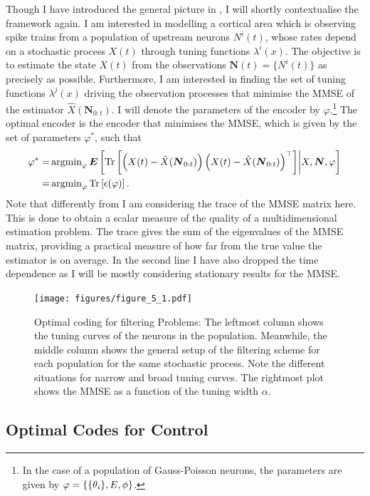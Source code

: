 Though I have introduced the general picture in , I will shortly contextualise the framework again. I am interested in modelling a cortical area which is observing spike
trains from a population of upstream neurons $N^i(t)$, whose rates depend on a stochastic process $X(t)$ through tuning functions $\lambda^i(x)$. The objective is to estimate the 
state $X(t)$ from the observations
$\boldsymbol{N}(t) = \{N^i(t)\}$ as precisely as possible. Furthermore, I am interested in finding the set of tuning functions $\lambda^j(x)$ driving the observation processes that minimise 
the MMSE of the estimator $\hat{X}(\boldsymbol{N}_{0:t})$. I will denote the parameters of the encoder by $\varphi$.\footnote{In the case of a population of Gauss-Poisson neurons, 
the parameters are given by $\varphi = \{\{\theta_i\}, E, \phi\}$.} The optimal encoder is the encoder that minimises the MMSE, which is given by the set of parameters $\varphi^*$,
such that
\begin{align*}
\varphi^* =& \operatorname{argmin}_\varphi \boldsymbol{E}\left[\operatorname{Tr}\left[\left(X(t) - \hat{X}(\boldsymbol{N}_{0:t})\right)\left(X(t) - \hat{X}(\boldsymbol{N}_{0:t})\right)^\top \right]\middle| X, \boldsymbol{N},\varphi\right]\\
=& \operatorname{argmin}_\varphi \operatorname{Tr}\left[\epsilon(\varphi)\right].
\end{align*}
Note that differently from  I am considering the trace of the MMSE matrix here. This is done to obtain a scalar measure of the quality of a
multidimensional estimation problem. The trace gives the sum of the eigenvalues of the MMSE matrix, providing a practical measure of how far from the true value
the estimator is on average. In the second line I have also dropped the time dependence as I will be mostly considering stationary results for the MMSE.
\par

\begin{figure}
\label{fig:filtering_expl}
\texttt{[image: figures/figure\_5\_1.pdf]}
\caption[Optimal coding for filtering.]{Optimal coding for filtering Problems: The leftmost column shows the tuning curves of the neurons in the population. Meanwhile, the middle column
shows the general setup of the filtering scheme for each population for the same stochastic process. Note the different situations for narrow and broad tuning curves.
The rightmost plot shows the MMSE as a function of the tuning width $\alpha$.}
\end{figure}

\subsection{Optimal Codes for Control}


